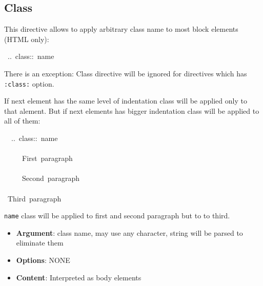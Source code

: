 \documentclass[12pt]{article}
\begin{document}
\subsection{Class}

This directive allows to apply arbitrary class name to most block elements
(HTML only):

\begin{ttfamily}\begin{flushleft}
\mbox{~..~class::~name}\\
\end{flushleft}\end{ttfamily}

There is an exception: Class directive will be ignored for directives which
has \texttt{:class:} option.

If next element has the same level of indentation class will be applied only
to that alement. But if next elements has bigger indentation class will be
applied to all of them:

\begin{ttfamily}\begin{flushleft}
\mbox{~~..~class::~name}\\
\mbox{}\\
\mbox{~~~~~First~paragraph}\\
\mbox{}\\
\mbox{~~~~~Second~paragraph}\\
\mbox{}\\
\mbox{~Third~paragraph}\\
\end{flushleft}\end{ttfamily}

\texttt{name} class will be applied to first and second paragraph but to to third.

\begin{center}
\end{center}
\begin{itemize}
\item
\textbf{Argument}: class name, may use any character, string will be parsed to
eliminate them

\item
\textbf{Options}: NONE

\item
\textbf{Content}: Interpreted as body elements
\end{itemize}
\hypertarget{ldefault-role}{}
\end{document}
